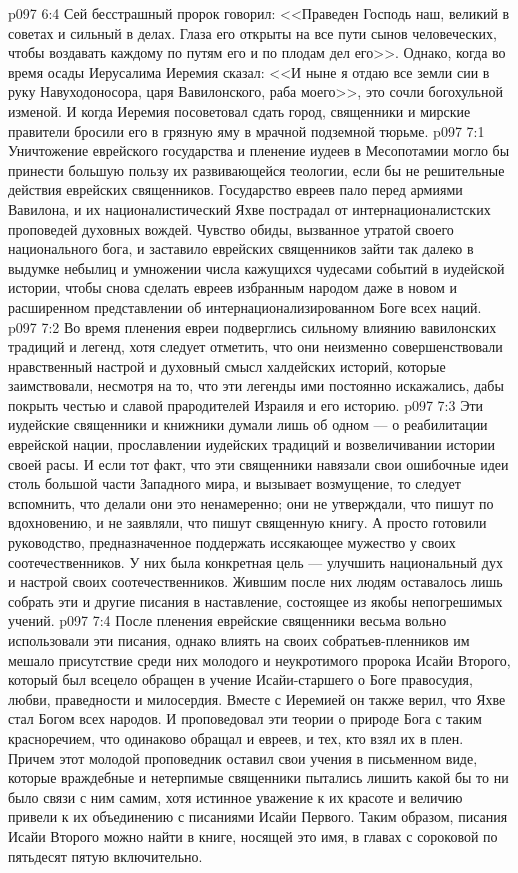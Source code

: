\vs p097 6:4 Сей бесстрашный пророк говорил: <<Праведен Господь наш, великий в советах и сильный в делах. Глаза его открыты на все пути сынов человеческих, чтобы воздавать каждому по путям его и по плодам дел его>>. Однако, когда во время осады Иерусалима Иеремия сказал: <<И ныне я отдаю все земли сии в руку Навуходоносора, царя Вавилонского, раба моего>>, это сочли богохульной изменой. И когда Иеремия посоветовал сдать город, священники и мирские правители бросили его в грязную яму в мрачной подземной тюрьме.
\vs p097 7:1 Уничтожение еврейского государства и пленение иудеев в Месопотамии могло бы принести большую пользу их развивающейся теологии, если бы не решительные действия еврейских священников. Государство евреев пало перед армиями Вавилона, и их националистический Яхве пострадал от интернационалистских проповедей духовных вождей. Чувство обиды, вызванное утратой своего национального бога, и заставило еврейских священников зайти так далеко в выдумке небылиц и умножении числа кажущихся чудесами событий в иудейской истории, чтобы снова сделать евреев избранным народом даже в новом и расширенном представлении об интернационализированном Боге всех наций.
\vs p097 7:2 Во время пленения евреи подверглись сильному влиянию вавилонских традиций и легенд, хотя следует отметить, что они неизменно совершенствовали нравственный настрой и духовный смысл халдейских историй, которые заимствовали, несмотря на то, что эти легенды ими постоянно искажались, дабы покрыть честью и славой прародителей Израиля и его историю.
\vs p097 7:3 Эти иудейские священники и книжники думали лишь об одном --- о реабилитации еврейской нации, прославлении иудейских традиций и возвеличивании истории своей расы. И если тот факт, что эти священники навязали свои ошибочные идеи столь большой части Западного мира, и вызывает возмущение, то следует вспомнить, что делали они это ненамеренно; они не утверждали, что пишут по вдохновению, и не заявляли, что пишут священную книгу. А просто готовили руководство, предназначенное поддержать иссякающее мужество у своих соотечественников. У них была конкретная цель --- улучшить национальный дух и настрой своих соотечественников. Жившим после них людям оставалось лишь собрать эти и другие писания в наставление, состоящее из якобы непогрешимых учений.
\vs p097 7:4 После пленения еврейские священники весьма вольно использовали эти писания, однако влиять на своих собратьев\hyp{}пленников им мешало присутствие среди них молодого и неукротимого пророка Исайи Второго, который был всецело обращен в учение Исайи\hyp{}старшего о Боге правосудия, любви, праведности и милосердия. Вместе с Иеремией он также верил, что Яхве стал Богом всех народов. И проповедовал эти теории о природе Бога с таким красноречием, что одинаково обращал и евреев, и тех, кто взял их в плен. Причем этот молодой проповедник оставил свои учения в письменном виде, которые враждебные и нетерпимые священники пытались лишить какой бы то ни было связи с ним самим, хотя истинное уважение к их красоте и величию привели к их объединению с писаниями Исайи Первого. Таким образом, писания Исайи Второго можно найти в книге, носящей это имя, в главах с сороковой по пятьдесят пятую включительно.
